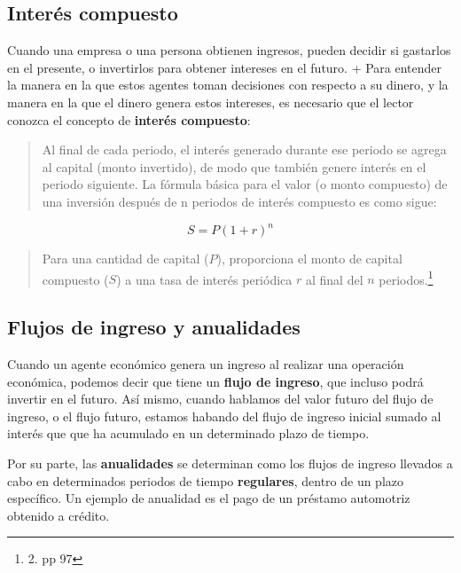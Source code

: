\documentclass{article}
\begin{document}
        \subsection{Interés compuesto}

            Cuando una empresa o una persona obtienen ingresos, pueden decidir si gastarlos en el presente, o invertirlos para obtener intereses en el futuro. +
            Para entender la manera en la que estos agentes toman decisiones con respecto a su dinero, y la manera en la que el dinero genera estos intereses, es necesario que el lector conozca el concepto de \textbf{interés compuesto}:

            \begin{quote}
                Al final de cada periodo, el interés generado durante ese periodo se agrega al capital (monto invertido), de modo que también genere interés en el periodo siguiente. La fórmula básica para el valor (o monto compuesto) de una inversión después de n periodos de interés compuesto es como sigue:
            \end{quote}
            \begin{equation}
                S=P(1+r)^{n}
            \end{equation}

            \begin{quote}
                Para una cantidad de capital ($P$), proporciona el monto de capital compuesto ($S$) a una tasa de interés periódica $r$ al final del $n$ periodos.\footnote[1]{2. pp 97}
            \end{quote}

        \subsection{Flujos de ingreso y anualidades}

            Cuando un agente económico genera un ingreso al realizar una operación económica, podemos decir que tiene un \textbf{flujo de ingreso}, que incluso podrá invertir en el futuro. Así mismo, cuando hablamos del valor futuro del flujo de ingreso, o el flujo futuro, estamos habando del flujo de ingreso inicial sumado al interés que que ha acumulado en un determinado plazo de tiempo.

            Por su parte, las \textbf{anualidades} se determinan como los flujos de ingreso llevados a cabo en determinados periodos de tiempo \textbf{regulares}, dentro de un plazo específico. Un ejemplo de anualidad es el pago de un préstamo automotriz obtenido a crédito.
\end{document}
